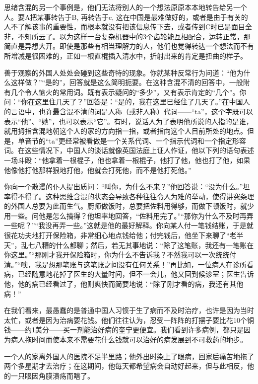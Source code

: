 \documentclass[12pt,oneside]{book}
\begin{document}
\begin{common-format}
思绪含混的另一个事例是，他们无法将别人的一个想法原原本本地转告给另一个人。要A把某事转告于B, 再转告于c, 这在中国是最难做好的，或者是由于有关的人不了解该事的重要性，而根本就没有把该信息传下去，或者传到C时已是面目全非，不知所云了。以为这样一台复杂机器中的3个齿轮能互相配合，运转正常，那简直是异想大开。即使是那些有相当理解力的人，他们也觉得转达一个想法而不有所增减是很困难的，正如一根直棍插入清水中，折射出来的肯定是扭曲的样子。 

善于观察的外国人处处会碰到这些奇特的现象。你就某种反常行为问道：“他为什么这样做？”“是的”，回答就是这么简明扼要。在这种含混不清的回答中，一般附有几个令人恼火的常用词。既有表示疑问的“多少”，又有表示肯定的“几个”。你问：“你在这里住几天了？”回答是：“是的，我在这里已经住了几天了。”在中国人的言语中，也许最含混不清的词是人称（或非人称）代词——“ta”，这个字既可以表示“他”、“她”，也可以表示“它”。有时，说话人为了表明他所说的人指的是谁，就用拇指含混地朝这个人的家的方向指一指，或者指向这个人目前所处的地点。但是，单音节的“ta”更经常被看做是一个关系代词、一个指示代词和一个指定形容词。在这些情况下，中国人的谈话就像英国法庭上证人作证，他以下列的语句表述一场斗殴：“他拿着一根棍子，他也拿着一根棍子，他打了他，他也打了他，如果他像他打他那样狠地打他，他就会打死他，而不是他打死他。” 

你向一个散漫的仆人提出质问：“叫你，为什么不来？”他回答说：“没为什么。”坦率得不得了。这种思维含混的状态会导致各种往往令人为难的举动，使得讲究条理的外国人总要为此而生气。厨师做饭时，总要把佐料用得够，而做下顿饭时，就少用一些。问他是怎么搞得？他坦率地回答，“佐料用完了。”“那你为什么不及时再弄一些呢？”“我没再弄一些。”这就是他的最好解释。你向某人付一笔钱结账，于是就很花功夫地打开保险箱，非常细心地点钱给他；付完钱后，他坐下来聊了“老半天”，乱七八糟的什么都聊；然后，若无其事地说：“除了这笔账，我还有一笔账在你这里。”“那刚才我开保险箱时，你为什么不告诉我？不然我可以一次统统付清。”“噢，我是想那笔账与这笔账之间没有任何关系！”再比如，一位病人在诊所看病，已经随意地花掉了医生的大量时间，但不一会儿，他又回到候诊室；医生告诉他，他的病已经看过了，他则爽快而简要地说：“除了刚才看的病，我还有其他病！” 

在我们看来，最愚蠢的是普通中国人习惯于生了病而不及时治疗，也许是因为当时太忙，或者是因为治病要花钱。他们往往认为，忍受一阵阵的打摆子要比花10个铜钱——约1美分——买一剂能治好病的奎宁更便宜。我们看到许多病例，都只是因为病人拖时间而使本来不需要花什么钱就可以治好的病发展到不可救药的地步。 

一个人的家离外国人的医院不足半里路；他外出时染上了眼病，回家后痛苦地拖了两个多星期才去治疗；在这期间，他每天都希望病会自动好起来，但与此相反，他的一只眼因角膜溃疡而瞎了。 


\end{common-format}
\end{document}
